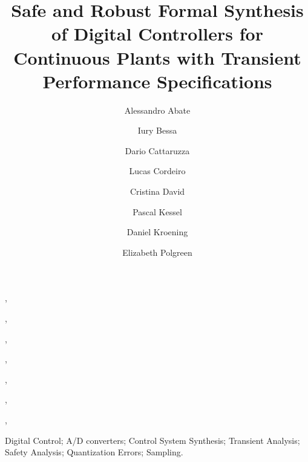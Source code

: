 \documentclass[twocolumn]{autart}    %
\begin{document}
\newcommand\tool{{\sf DSSynth}}
\begin{frontmatter}



\title{Safe and Robust Formal Synthesis of Digital Controllers
       for Continuous Plants with Transient Performance Specifications}


\author[oxford]{Alessandro Abate},
\author[manaus]{Iury Bessa},
\author[oxford]{Dario Cattaruzza},
\author[oxford,manaus]{Lucas Cordeiro},
\author[oxford]{Cristina David},
\author[oxford]{Pascal Kessel},
\author[oxford]{Daniel Kroening},
\author[oxford]{Elizabeth Polgreen}

\address[oxford]{University of Oxford, UK}
\address[manaus]{Federal University of Amazonas, Brazil}



          
\begin{keyword}                           %
Digital Control; A/D converters; Control System Synthesis; Transient Analysis; Safety Analysis; Quantization Errors; Sampling.               %
\end{keyword}                             %


\end{frontmatter}
\end{document}
